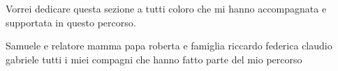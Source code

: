 \thispagestyle{plain}
Vorrei dedicare questa sezione a tutti coloro che mi hanno accompagnata e supportata in questo percorso. 

Samuele e relatore 
mamma papa roberta e famiglia
riccardo 
federica
claudio 
gabriele  
tutti i miei compagni che hanno fatto parte del mio percorso 
